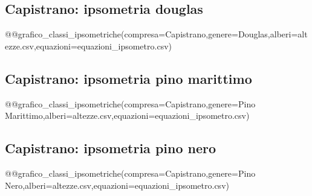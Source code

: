 \subsection*{Capistrano: ipsometria douglas}
@@grafico_classi_ipsometriche(compresa=Capistrano,genere=Douglas,alberi=altezze.csv,equazioni=equazioni_ipsometro.csv)
\clearpage

\subsection*{Capistrano: ipsometria pino marittimo}
@@grafico_classi_ipsometriche(compresa=Capistrano,genere=Pino Marittimo,alberi=altezze.csv,equazioni=equazioni_ipsometro.csv)

\subsection*{Capistrano: ipsometria pino nero}
@@grafico_classi_ipsometriche(compresa=Capistrano,genere=Pino Nero,alberi=altezze.csv,equazioni=equazioni_ipsometro.csv)

\clearpage

